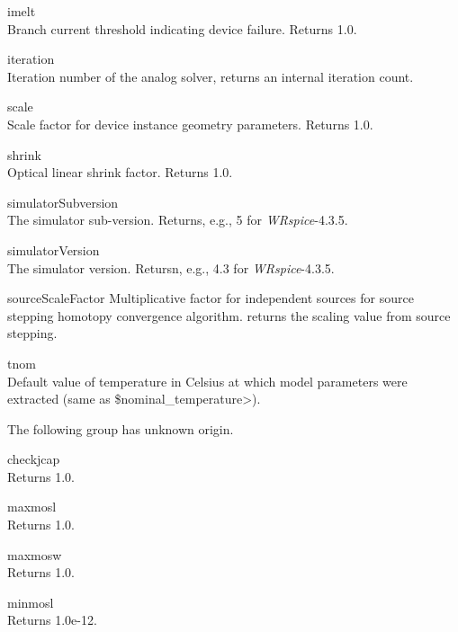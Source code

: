 \begin{description}
\begin{description}
\item{\vt imelt}\\
Branch current threshold indicating device failure.  Returns 1.0.

\item{\vt iteration}\\
Iteration number of the analog solver, returns an internal iteration
count.

\item{\vt scale}\\
Scale factor for device instance geometry parameters.  Returns 1.0.

\item{\vt shrink}\\
Optical linear shrink factor.  Returns 1.0.

\item{\vt simulatorSubversion}\\
The simulator sub-version.  Returns, e.g., 5 for {\it WRspice\/}-4.3.5.

\item{\vt simulatorVersion}\\
The simulator version.  Retursn, e.g., 4.3 for {\it WRspice\/}-4.3.5.

\item{\vt sourceScaleFactor}
Multiplicative factor for independent sources for source stepping
homotopy convergence algorithm.  {\WRspice} returns the scaling value
from source stepping.

\item{\vt tnom}\\
Default value of temperature in Celsius at which model parameters were
extracted (same as {\vt \$nominal\_temperature\/}>).
\end{description}

The following group has unknown origin.

\begin{description}
\item{\vt checkjcap}\\
Returns 1.0.

\item{\vt maxmosl}\\
Returns 1.0.

\item{\vt maxmosw}\\
Returns 1.0.

\item{\vt minmosl}\\
Returns 1.0e-12.


\end{description}
\end{description}
